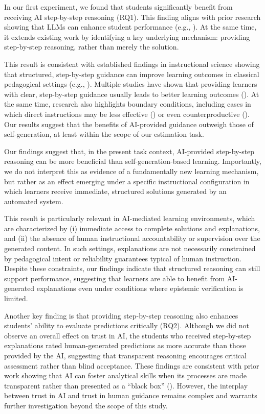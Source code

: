 \documentclass[
  11pt,
]{article}
\begin{document}
In our first experiment, we found that students significantly benefit from receiving AI step-by-step reasoning (RQ1). This finding aligns with prior research showing that LLMs can enhance student performance (e.g., ). At the same time, it extends existing work by identifying a key underlying mechanism: providing step-by-step reasoning, rather than merely the solution.

This result is consistent with established findings in instructional science showing that structured, step-by-step guidance can improve learning outcomes in classical pedagogical settings (e.g., ). Multiple studies have shown that providing learners with clear, step-by-step guidance usually leads to better learning outcomes (). At the same time, research also highlights boundary conditions, including cases in which direct instructions may be less effective () or even counterproductive (). Our results suggest that the benefits of AI-provided guidance outweigh those of self-generation, at least within the scope of our estimation task.

Our findings suggest that, in the present task context, AI-provided step-by-step reasoning can be more beneficial than self-generation-based learning. Importantly, we do not interpret this as evidence of a fundamentally new learning mechanism, but rather as an effect emerging under a specific instructional configuration in which learners receive immediate, structured solutions generated by an automated system.

This result is particularly relevant in AI-mediated learning environments, which are characterized by (i) immediate access to complete solutions and explanations, and (ii) the absence of human instructional accountability or supervision over the generated content. In such settings, explanations are not necessarily constrained by pedagogical intent or reliability guarantees typical of human instruction. Despite these constraints, our findings indicate that structured reasoning can still support performance, suggesting that learners are able to benefit from AI-generated explanations even under conditions where epistemic verification is limited.

Another key finding is that providing step-by-step reasoning also enhances students' ability to evaluate predictions critically (RQ2). Although we did not observe an overall effect on trust in AI, the students who received step-by-step explanations rated human-generated predictions as more accurate than those provided by the AI, suggesting that transparent reasoning encourages critical assessment rather than blind acceptance. These findings are consistent with prior work showing that AI can foster analytical skills when its processes are made transparent rather than presented as a ``black box'' (). However, the interplay between trust in AI and trust in human guidance remains complex and warrants further investigation beyond the scope of this study.
\end{document}
